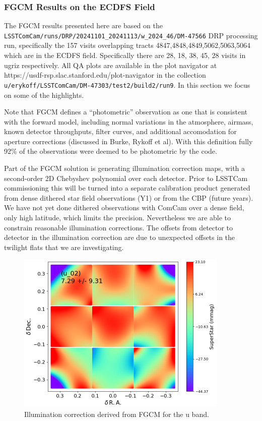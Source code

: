 \subsubsection{FGCM Results on the ECDFS Field}

The FGCM results presented here are based on the
\texttt{LSSTComCam/runs/DRP/20241101\_20241113/w\_2024\_46/DM-47566} DRP processing
run, specifically the 157 visits overlapping tracts
4847,4848,4849,5062,5063,5064 which are in the ECDFS field. Specifically there
are 28, 18, 38, 45, 28 visits in ugriz respectively. All QA plots are available
in the plot navigator at https://usdf-rsp.slac.stanford.edu/plot-navigator in
the collection \texttt{u/erykoff/LSSTComCam/DM-47303/test2/build2/run9}.  In this
section we focus on some of the highlights.

Note that FGCM defines a ``photometric'' observation as one that is consistent
with the forward model, including normal variations in the atmosphere, airmass,
known detector throughputs, filter curves, and additional accomodation for
aperture corrections (discussed in Burke, Rykoff et al).  With this definition
fully 92\% of the observations were deemed to be photometric by the code.


Part of the FGCM solution is generating illumination correction maps, with a
second-order 2D Chebyshev polynomial over each detector.  Prior to LSSTCam
commissioning this will be turned into a separate calibration product generated
from dense dithered star field observations (Y1) or from the CBP (future
years). We have not yet done dithered observations with ComCam over a dense
field, only high latitude, which limits the precision.  Nevertheless we are
able to constrain reasonable illumination corrections.  The offsets from
detector to detector in the illumination correction are due to unexpected
offsets in the twilight flats that we are investigating.

\begin{figure}
  \begin{center}
    \includegraphics[width=0.9\textwidth]{photometric_calibration_figures/illumcorr_u.png}
  \end{center}
  \caption{Illumination correction derived from FGCM for the u band.}
\end{figure}

